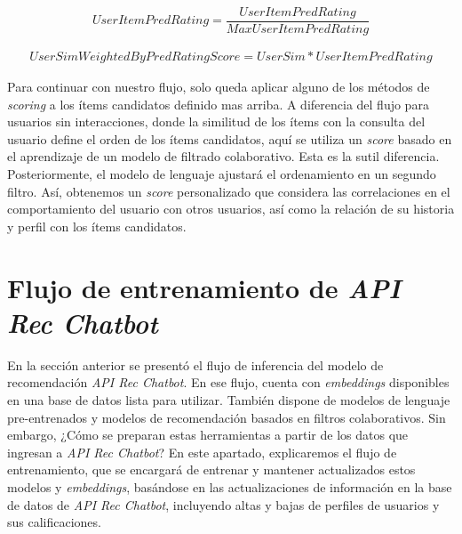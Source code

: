 \documentclass[11pt,a4paper,twoside]{thesis}
\begin{document}
\begin{itemize}
	      \begin{equation}
		      User Item Pred Rating = \frac{User Item Pred Rating}{Max User Item Pred Rating}
	      \end{equation}

	      \begin{align}
		      User Sim Weighted By Pred Rating Score = User Sim * User Item Pred Rating
	      \end{align}
\end{itemize}

Para continuar con nuestro flujo, solo queda aplicar alguno de los métodos de \textit{scoring} a los ítems candidatos definido mas arriba. A diferencia del flujo para usuarios sin interacciones, donde la similitud de los ítems con la consulta del usuario define el orden de los ítems candidatos, aquí se utiliza un \textit{score} basado en el aprendizaje de un modelo de filtrado colaborativo. Esta es la sutil diferencia. Posteriormente, el modelo de lenguaje ajustará el ordenamiento en un segundo filtro. Así, obtenemos un \textit{score} personalizado que considera las correlaciones en el comportamiento del usuario con otros usuarios, así como la relación de su historia y perfil con los ítems candidatos.

\vfill
\chapter{Flujo de entrenamiento de \textit{API Rec Chatbot}}

En la sección anterior se presentó el flujo de inferencia del modelo de recomendación \textit{API Rec Chatbot}. En ese flujo, cuenta con \textit{embeddings} disponibles en una base de datos lista para utilizar. También dispone de modelos de lenguaje pre-entrenados y modelos de recomendación basados en filtros colaborativos. Sin embargo, ¿Cómo se preparan estas herramientas a partir de los datos que ingresan a \textit{API Rec Chatbot}? En este apartado, explicaremos el flujo de entrenamiento, que se encargará de entrenar y mantener actualizados estos modelos y \textit{embeddings}, basándose en las actualizaciones de información en la base de datos de \textit{API Rec Chatbot}, incluyendo altas y bajas de perfiles de usuarios y sus calificaciones.
\end{document}

